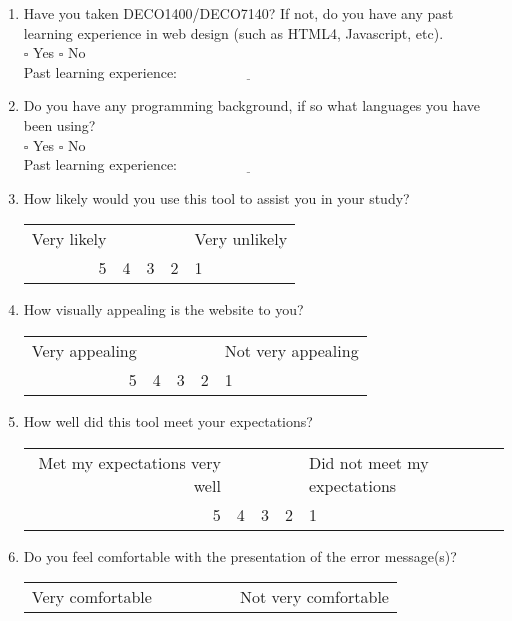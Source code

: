 \documentclass[11pt]{article}
\begin{document}
\begin{enumerate}
\item Have you taken DECO1400/DECO7140? If not, do you have any past learning experience in web design (such as HTML4, Javascript, etc). \\ $\square$ Yes $\square$ No \\ Past learning experience: $\underline{\hspace{4cm}}$
\item Do you have any programming background, if so what languages you have been using? \\ $\square$ Yes $\square$ No \\ Past learning experience: $\underline{\hspace{4cm}}$
\item How likely would you use this tool to assist you in your study? \\ 
\begin{center}
\begin{tabular}{r | c | c | c | l}
Very likely & ~ & ~ & ~ & Very unlikely \\
5 & 4 & 3 & 2 & 1
\end{tabular}
\end{center}
\item How visually appealing is the website to you? \\
\begin{center}
\begin{tabular}{r | c | c | c | l}
Very appealing & ~ & ~ & ~ & Not very appealing \\
5 & 4 & 3 & 2 & 1
\end{tabular}
\end{center}
\item How well did this tool meet your expectations? \\
\begin{center}
\begin{tabular}{r | c | c | c | l}
Met my expectations very well & ~ & ~ & ~ & Did not meet my expectations \\
5 & 4 & 3 & 2 & 1
\end{tabular}
\end{center}
\item Do you feel comfortable with the presentation of the error message(s)? \\
\begin{center}
\begin{tabular}{r | c | c | c | l}
Very comfortable & ~ & ~ & ~ & Not very comfortable \\

\end{tabular}
\end{center}
\end{enumerate}
\end{document}
